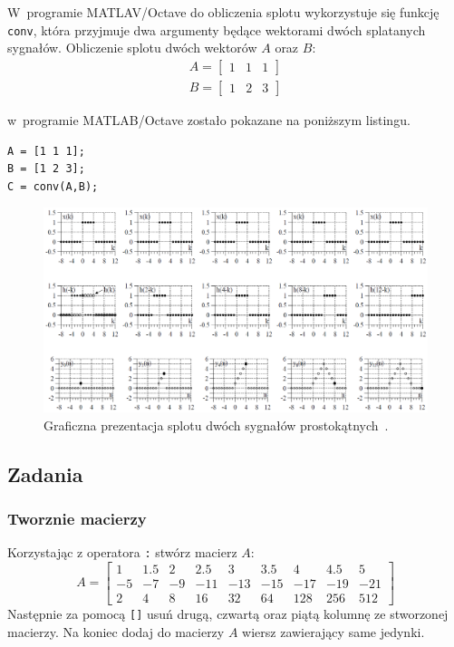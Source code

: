 W~programie MATLAV/Octave do obliczenia splotu wykorzystuje się funkcję \texttt{conv}, która przyjmuje dwa argumenty będące wektorami dwóch splatanych sygnałów. Obliczenie splotu dwóch wektorów $A$ oraz $B$:
\begin{gather*}
	A=
	\begin{bmatrix}
		1 & 1 & 1
	\end{bmatrix}\\
	B=
	\begin{bmatrix}
		1 & 2 & 3
	\end{bmatrix}
\end{gather*}

w~programie MATLAB/Octave zostało pokazane na poniższym listingu.
\begin{lstlisting}[caption=Obliczanie splotu dwóch wektorów , label=lab1/lst/convolution]
A = [1 1 1];
B = [1 2 3];
C = conv(A,B);
\end{lstlisting}

\begin{figure}[hbt!]
	\centering
	\includegraphics[width=0.9\linewidth]{images/convolution}
	\caption{Graficzna prezentacja splotu dwóch sygnałów prostokątnych~\cite{zielinski_cyfrowe_przetwarzanie_sygnalow}.}
	\label{lab1/fig/convolution}
\end{figure}


\subsection{Zadania}
\subsubsection{Tworznie macierzy}
Korzystając z operatora \texttt{:} stwórz macierz $A$:
\begin{equation*}
	A=
	\begin{bmatrix}
		1 & 1.5 & 2 & 2.5 & 3 & 3.5 & 4 & 4.5 & 5 \\
		-5 & -7 & -9 & -11 & -13 & -15 & -17 & -19 & -21\\
		2 & 4 & 8 & 16 & 32 & 64 & 128 & 256 & 512
	\end{bmatrix}
\end{equation*}
Następnie za pomocą \texttt{[]} usuń drugą, czwartą oraz piątą kolumnę ze stworzonej macierzy. Na koniec dodaj do macierzy $A$ wiersz zawierający same jedynki.

